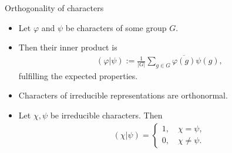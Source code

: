 \documentclass[10pt]{beamer}
\begin{document}
	\begin{frame}{Orthogonality of characters}		
		\begin{definition}\pause
			\begin{itemize}
				\item Let $\varphi$ and $\psi$ be characters of some group $G$.\pause
				\item Then their \alert{inner product} is \begin{align*}
					(\varphi|\psi) := \frac{1}{|G|}\sum_{g \in G}\overline{\varphi(g)}\psi(g),
				\end{align*}
				fulfilling the expected properties.\pause
			\end{itemize}
		\end{definition}
		
		\begin{theorem}
			\begin{itemize}
			
				\item Characters of irreducible representations are orthonormal.
				
				\item Let $\chi, \psi$ be irreducible characters. Then \begin{align*}
					(\chi|\psi) = \begin{cases}
						1, \quad \chi = \psi, \\
						0, \quad \chi \neq \psi.
					\end{cases}
				\end{align*}
			\end{itemize}
		\end{theorem}
	\end{frame}
\end{document}
